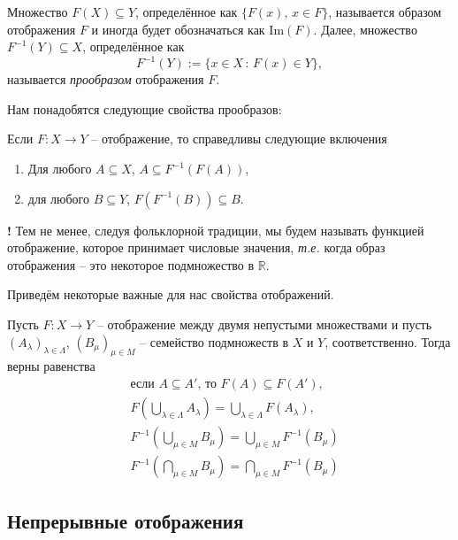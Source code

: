 Множество $F(X) \subseteq Y$, определённое как $\{F(x), \, x \in F\}$, называется образом отображения $F$ и иногда будет обозначаться как $\mathrm{Im}(F).$ Далее, множество $F^{-1}(Y) \subseteq X$, определённое как
\[
 F^{-1}(Y):= \{x \in X\, :\, F(x) \in Y\},
\]
называется \textit{прообразом} отображения $F.$

Нам понадобятся следующие свойства прообразов:

\begin{proposition}\label{good_for_preimage}
    Если $F: X \to Y$ -- отображение, то справедливы следующие включения
    \begin{enumerate}
        \item Для любого $A \subseteq X$, $A \subseteq F^{-1}(F(A))$,
        \item для любого $B \subseteq Y$, $F(F^{-1}(B)) \subseteq B.$
    \end{enumerate}
\end{proposition}

\begin{mydanger}{\bf !}
 Тем не менее, следуя фольклорной традиции, мы будем называть функцией отображение, которое принимает числовые значения, \textit{т.е.} когда образ отображения -- это некоторое подмножество в $\mathbb{R}.$
\end{mydanger}

Приведём некоторые важные для нас свойства отображений.

\begin{proposition}\label{good_for_maps}
    Пусть $F:X \to Y$ -- отображение между двумя непустыми множествами и пусть $(A_\lambda)_{\lambda \in \Lambda}$, $(B_\mu)_{\mu \in M}$ -- семейство подмножеств в $X$ и $Y$, соответственно. Тогда верны равенства
    \begin{align}
        & \mbox{если $A \subseteq A'$, то $F(A) \subseteq F(A')$},\label{A<B->F(A)<F(B)}\\ 
        & F\left( \bigcup_{\lambda \in \Lambda} A_\lambda \right) = \bigcup_{\lambda \in \Lambda} F(A_\lambda), \label{F(U)=UF} \\
        & F^{-1} \left( \bigcup_{\mu \in M} B_\mu \right) = \bigcup_{\mu \in M} F^{-1}(B_\mu) \\
        & F^{-1} \left( \bigcap_{\mu \in M} B_\mu \right) = \bigcap_{\mu \in M} F^{-1}(B_\mu)
    \end{align}
        
\end{proposition}


\subsection{Непрерывные отображения}

